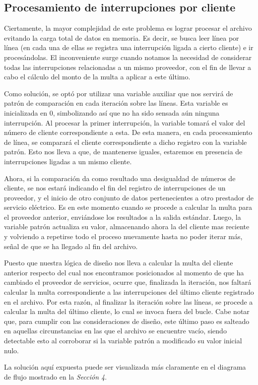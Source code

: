 \documentclass{article}
\begin{document}
\subsection{Procesamiento de interrupciones por cliente}

	Ciertamente, la mayor complejidad de este problema es lograr procesar el archivo evitando la carga total de datos en memoria. Es decir, se busca leer línea por línea (en cada una de ellas se registra una interrupción ligada a cierto cliente) e ir procesándolas. El inconveniente surge cuando notamos la necesidad de considerar todas las interrupciones relacionadas a un mismo proveedor, con el fin de llevar a cabo el cálculo del monto de la multa a aplicar a este último. 
	\par
	Como solución, se optó por utilizar una variable auxiliar que nos servirá de patrón de comparación en cada iteración sobre las líneas. Esta variable es inicializada en 0, simbolizando así que no ha sido sensada aún ninguna interrupción. Al procesar la primer interrupción, la variable tomará el valor del número de cliente correspondiente a esta. De esta manera, en cada procesamiento de línea, se comparará el cliente correspondiente a dicho registro con la variable patrón. Esto nos lleva a que, de mantenerse iguales, estaremos en presencia de interrupciones ligadas a un mismo cliente. 
	\par
	Ahora, si la comparación da como resultado una desigualdad de números de cliente, se nos estará indicando el fin del registro de interrupciones de un proveedor, y el inicio de otro conjunto de datos pertenecientes a otro prestador de servicio eléctrico. Es en este momento cuando se procede a calcular la multa para el proveedor anterior, enviándose los resultados a la salida estándar. Luego, la variable patrón actualiza su valor, almacenando ahora la del cliente mas reciente y volviendo a repetirse todo el proceso nuevamente hasta no poder iterar más, señal de que se ha llegado al fin del archivo.
	\par
	Puesto que nuestra lógica de diseño nos lleva a calcular la multa del cliente anterior respecto del cual nos encontramos posicionados al momento de que ha cambiado el proveedor de servicios, ocurre que, finalizada la iteración, nos faltará calcular la multa correspondiente a las interrupciones del último cliente registrado en el archivo. Por esta razón, al finalizar la iteración sobre las líneas, se procede a calcular la multa del último cliente, lo cual se invoca fuera del bucle. Cabe notar que, para cumplir con las consideraciones de diseño, este último paso es salteado en aquellas circunstancias en las que el archivo se encuentre vacío, siendo detectable esto al corroborar si la variable patrón a modificado su valor inicial nulo.
	\par
	La solución aquí expuesta puede ser visualizada más claramente en el diagrama de flujo mostrado en la \textit{Sección 4}.
	\bigskip
\end{document}
